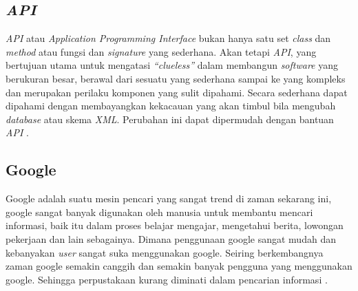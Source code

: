 \subsection{\textit{API}}
\par 
\textit{API} atau  \textit{Application  Programming Interface} bukan  hanya satu set \textit{class} dan \textit{method} atau fungsi dan \textit{signature} yang  sederhana.  Akan  tetapi  \textit{API},  yang  bertujuan utama untuk mengatasi \textit{“clueless”} dalam membangun \textit{software}  yang    berukuran besar, berawal dari sesuatu yang sederhana sampai ke yang kompleks dan merupakan perilaku komponen yang sulit dipahami. Secara   sederhana dapat dipahami dengan membayangkan  kekacauan  yang akan  timbul  bila  mengubah \textit{database}  atau  skema \textit{XML}. Perubahan  ini  dapat   dipermudah dengan bantuan \textit{API} \cite{rosdania2016sistem}.

\subsection{Google}
\par 
Google adalah suatu mesin pencari yang sangat trend di zaman sekarang ini, google sangat banyak digunakan oleh manusia untuk membantu mencari informasi, baik itu dalam proses belajar mengajar, mengetahui berita, lowongan pekerjaan dan lain sebagainya. Dimana penggunaan google sangat mudah dan kebanyakan \textit{user} sangat suka menggunakan google. Seiring berkembangnya zaman google semakin canggih dan semakin banyak pengguna yang menggunakan google. Sehingga perpustakaan kurang diminati dalam pencarian informasi \cite{lestari2016klasifikasi}.
